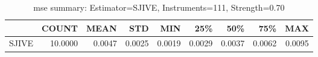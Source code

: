 \begin{table}[ht]
\centering
\caption{mse summary: Estimator=SJIVE, Instruments=111, Strength=0.70}
\begin{tabular}{lrrrrrrrr}
\toprule
 & COUNT & MEAN & STD & MIN & 25\% & 50\% & 75\% & MAX \\
\midrule
SJIVE & 10.0000 & 0.0047 & 0.0025 & 0.0019 & 0.0029 & 0.0037 & 0.0062 & 0.0095 \\
\bottomrule
\end{tabular}
\end{table}
